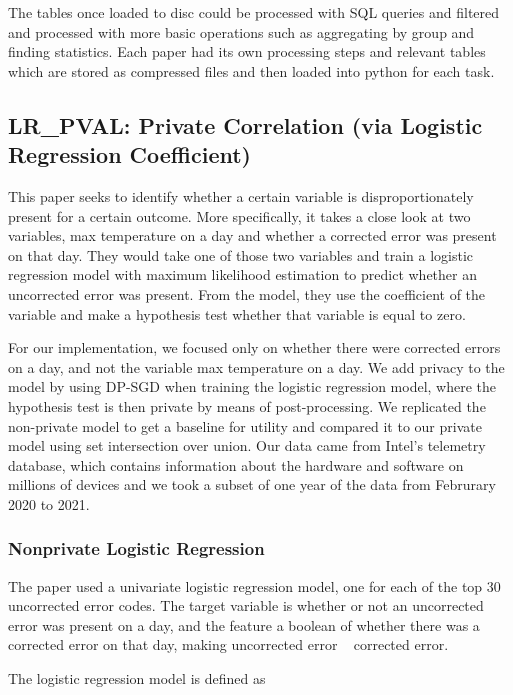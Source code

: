 \documentclass[12pt,letterpaper]{article}
\begin{document}
The tables once loaded to disc could be processed with SQL queries and filtered and processed with more basic operations such as aggregating by group and finding statistics. Each paper had its own processing steps and relevant tables which are stored as compressed files and then loaded into python for each task.

\subsection{LR\_PVAL: Private Correlation (via Logistic Regression Coefficient)}

This paper \cite{prodhealLR} seeks to identify whether a certain variable is disproportionately present for a certain outcome. 
More specifically, it takes a close look at two variables, max temperature on a day and whether a corrected error was present on that day. 
They would take one of those two variables and train a logistic regression model with maximum likelihood estimation to predict whether an uncorrected error was present.
From the model, they use the coefficient of the variable and make a hypothesis test whether that variable is equal to zero.

For our implementation, we focused only on whether there were corrected errors on a day, and not the variable max temperature on a day.
We add privacy to the model by using DP-SGD when training the logistic regression model, where the hypothesis test is then private by means of post-processing.
We replicated the non-private model to get a baseline for utility and compared it to our private model using set intersection over union.
Our data came from Intel's telemetry database, which contains information about the hardware and software on millions of devices
and we took a subset of one year of the data from Februrary 2020 to 2021.

\subsubsection{Nonprivate Logistic Regression}

The paper used a univariate logistic regression model, one for each of the top 30 uncorrected error codes.
The target variable is whether or not an uncorrected error was present on a day, 
and the feature a boolean of whether there was a corrected error on that day, 
making uncorrected error ~ corrected error.

The logistic regression model is defined as 
\end{document}
